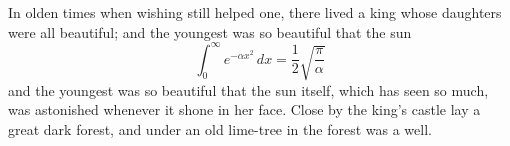 In olden times when wishing still helped one, there lived a king whose daughters were all beautiful; and the youngest was so beautiful that the sun
\[ \int_0^\infty e^{-\alpha x^2}\,dx = \frac{1}{2}\sqrt{\frac{\pi}{\alpha}} \]
and the youngest was so beautiful that the sun itself, which has seen so much, was astonished whenever it shone in her face. Close by the king's castle lay a great dark forest, and under an old lime-tree in the forest was a well.
